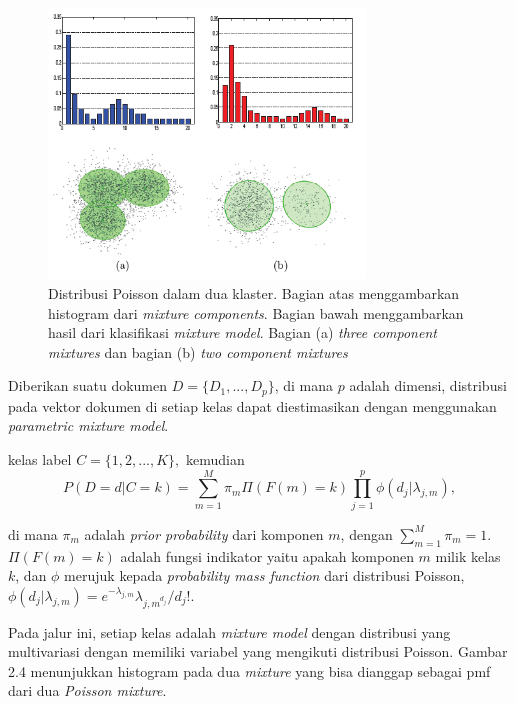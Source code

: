 \begin{figure}[H]
    \centering
    \includegraphics[width=0.75\textwidth]{gambar/Poisson Distribution in Two Cluster.PNG}
    \caption{Distribusi Poisson dalam dua klaster. Bagian atas menggambarkan histogram dari \textit{mixture components}. Bagian bawah menggambarkan hasil dari klasifikasi \textit{mixture model}. Bagian (a) \textit{three component mixtures} dan bagian (b) \textit{two component mixtures} \cite{song2008autotag}}
    \label{gambar:distribution_poisson}
\end{figure}

Diberikan suatu dokumen \(D = \{D_1, ..., D_p\}\), di mana \(p\) adalah dimensi, distribusi pada vektor dokumen di setiap kelas dapat diestimasikan dengan menggunakan \textit{parametric mixture model}.

kelas label \(C = \{1,2,...,K\},\) kemudian
\begin{equation}
\label{poisson_mixture_model_1}
    P(D = d | C = k) = \sum_{m=1}^{M}\pi_m\Pi(F(m) = k) \prod_{j=1}^{p}\phi(d_j|\lambda_{j,m}),
\end{equation}

di mana \(\pi_m\) adalah \textit{prior probability} dari komponen \(m\), dengan \(\sum_{m=1}^{M}\pi_m = 1\).\(\Pi(F(m) = k)\) adalah fungsi indikator yaitu apakah komponen \(m\) milik kelas \(k\), dan \(\phi\) merujuk kepada \textit{probability mass function} dari distribusi Poisson, \(\phi(d_j|\lambda_{j,m}) = e^{-\lambda_{j,m}}\lambda_{j,m^{d_j}}/ d_j\)!.

Pada jalur ini, setiap kelas adalah \textit{mixture model} dengan distribusi yang multivariasi dengan memiliki variabel yang mengikuti distribusi Poisson. Gambar 2.4 menunjukkan histogram pada dua \textit{mixture} yang bisa dianggap sebagai pmf dari dua \textit{Poisson mixture}.

